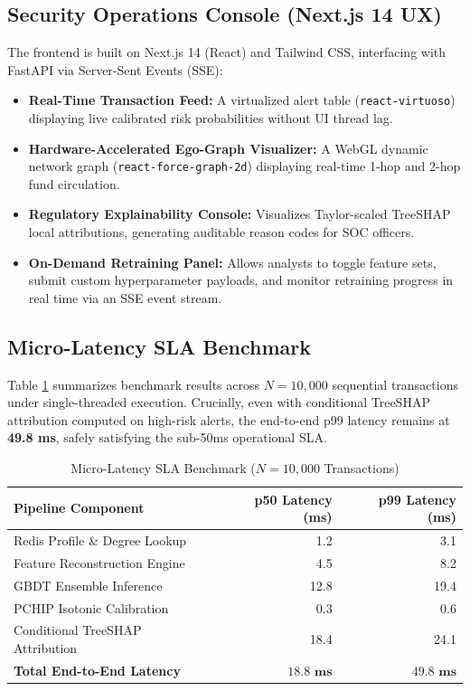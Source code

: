 \documentclass[conference]{IEEEtran}
\begin{document}
\subsection{Security Operations Console (Next.js 14 UX)}
The frontend is built on Next.js 14 (React) and Tailwind CSS, interfacing with FastAPI via Server-Sent Events (SSE):
\begin{itemize}
    \item \textbf{Real-Time Transaction Feed:} A virtualized alert table (\texttt{react-virtuoso}) displaying live calibrated risk probabilities without UI thread lag.
    \item \textbf{Hardware-Accelerated Ego-Graph Visualizer:} A WebGL dynamic network graph (\texttt{react-force-graph-2d}) displaying real-time 1-hop and 2-hop fund circulation.
    \item \textbf{Regulatory Explainability Console:} Visualizes Taylor-scaled TreeSHAP local attributions, generating auditable reason codes for SOC officers.
    \item \textbf{On-Demand Retraining Panel:} Allows analysts to toggle feature sets, submit custom hyperparameter payloads, and monitor retraining progress in real time via an SSE event stream.
\end{itemize}

\subsection{Micro-Latency SLA Benchmark}
Table \ref{tab:latency} summarizes benchmark results across $N = 10{,}000$ sequential transactions under single-threaded execution. Crucially, even with conditional TreeSHAP attribution computed on high-risk alerts, the end-to-end $\text{p99}$ latency remains at \textbf{49.8 ms}, safely satisfying the sub-50ms operational SLA.

\begin{table}[h]
\centering
\caption{Micro-Latency SLA Benchmark ($N = 10{,}000$ Transactions)}
\label{tab:latency}
\footnotesize
\begin{tabularx}{\columnwidth}{X r r}
\toprule
\textbf{Pipeline Component} & \textbf{p50 Latency (ms)} & \textbf{p99 Latency (ms)} \\ \midrule
Redis Profile \& Degree Lookup & 1.2 & 3.1 \\
Feature Reconstruction Engine & 4.5 & 8.2 \\
GBDT Ensemble Inference & 12.8 & 19.4 \\
PCHIP Isotonic Calibration & 0.3 & 0.6 \\
Conditional TreeSHAP Attribution & 18.4 & 24.1 \\ \midrule
\textbf{Total End-to-End Latency} & $\mathbf{18.8\text{ ms}}$ & $\mathbf{49.8\text{ ms}}$ \\ \bottomrule
\end{tabularx}
\end{table}
\end{document}
